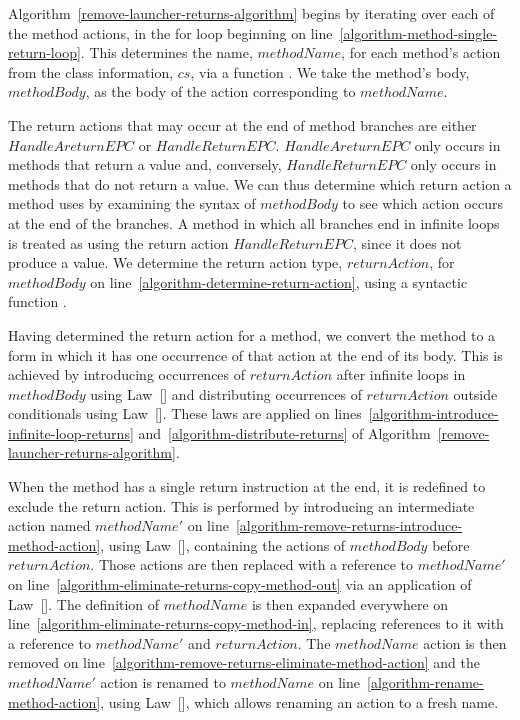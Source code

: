 Algorithm~\ref{remove-launcher-returns-algorithm} begins by iterating
over each of the method actions, in the for loop beginning on
line~\ref{algorithm-method-single-return-loop}.
This determines the name, $methodName$, for each method's action from
the class information, $cs$, via a function
.
We take the method's body, $methodBody$, as the body of the action
corresponding to $methodName$.

The return actions that may occur at the end of method branches are
either $HandleAreturnEPC$ or $HandleReturnEPC$.
$HandleAreturnEPC$ only occurs in methods that return a value and,
conversely, $HandleReturnEPC$ only occurs in methods that do not
return a value.
We can thus determine which return action a method uses by examining
the syntax of $methodBody$ to see which action occurs at the end of
the branches.
A method in which all branches end in infinite loops is treated as
using the return action $HandleReturnEPC$, since it does not produce a
value.
We determine the return action type, $returnAction$, for $methodBody$
on line~\ref{algorithm-determine-return-action}, using a syntactic
function .

Having determined the return action for a method, we convert the
method to a form in which it has one occurrence of that action at the
end of its body.
This is achieved by introducing occurrences of $returnAction$ after
infinite loops in $methodBody$ using
Law~[] and distributing occurrences of
$returnAction$ outside conditionals using
Law~[].
These laws are applied on
lines~\ref{algorithm-introduce-infinite-loop-returns}
and~\ref{algorithm-distribute-returns} of
Algorithm~\ref{remove-launcher-returns-algorithm}.

When the method has a single return instruction at the end, it is
redefined to exclude the return action.
This is performed by introducing an intermediate action named
$methodName'$ on
line~\ref{algorithm-remove-returns-introduce-method-action}, using
Law~[], containing the actions of
$methodBody$ before $returnAction$.
Those actions are then replaced with a reference to $methodName'$ on
line~\ref{algorithm-eliminate-returns-copy-method-out} via an
application of Law~[].
The definition of $methodName$ is then expanded everywhere on
line~\ref{algorithm-eliminate-returns-copy-method-in}, replacing
references to it with a reference to $methodName'$ and $returnAction$.
The $methodName$ action is then removed on
line~\ref{algorithm-remove-returns-eliminate-method-action} and the
$methodName'$ action is renamed to $methodName$ on
line~\ref{algorithm-rename-method-action}, using
Law~[], which allows renaming an action to a
fresh name.

